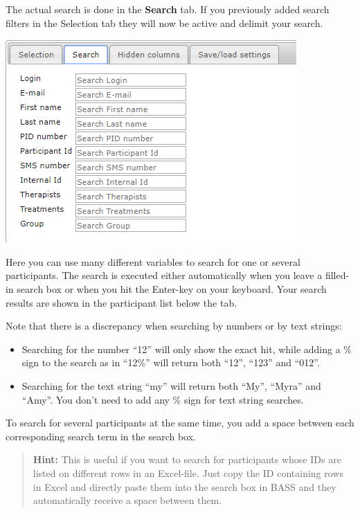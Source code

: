 \documentclass[]{book}
\begin{document}
The actual search is done in the \textbf{Search} tab. If you previously added search filters in the Selection tab they will now be active and delimit your search.

\includegraphics{images/search.png}

Here you can use many different variables to search for one or several participants. The search is executed either automatically when you leave a filled-in search box or when you hit the Enter-key on your keyboard. Your search results are shown in the participant list below the tab.

Note that there is a discrepancy when searching by numbers or by text strings:

\begin{itemize}
\item
  Searching for the number ``12'' will only show the exact hit, while adding a \% sign to the search as in ``12\%'' will return both ``12'', ``123'' and ``012''.
\item
  Searching for the text string ``my'' will return both ``My'', ``Myra'' and ``Amy''. You don't need to add any \% sign for text string searches.
\end{itemize}

To search for several participants at the same time, you add a space between each corresponding search term in the search box.

\begin{quote}
\textbf{Hint:} This is useful if you want to search for participants whose IDs are listed on different rows in an Excel-file. Just copy the ID containing rows in Excel and directly paste them into the search box in BASS and they automatically receive a space between them.
\end{quote}
\end{document}
